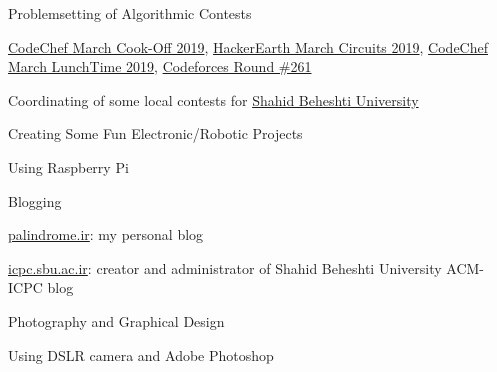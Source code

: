 

\begin{cvprojects}

  \cvproject
    {Problemsetting of Algorithmic Contests} %
    {} %
    {} %
    {} %
    {
      \begin{cvitems} %
        \item {\href{https://www.codechef.com/COOK104}{CodeChef March Cook-Off 2019}, \href{https://www.hackerearth.com/challenges/competitive/march-circuits-19/}{HackerEarth March Circuits 2019}, \href{https://www.codechef.com/LTIME70}{CodeChef March LunchTime 2019}, \href{https://codeforces.com/blog/entry/13394}{Codeforces Round \#261}}
        \item {Coordinating of some local contests for \href{http://en.sbu.ac.ir}{Shahid Beheshti University}}
      \end{cvitems}
    }

  \cvproject
    {Creating Some Fun Electronic/Robotic Projects} %
    {} %
    {} %
    {} %
    {\begin{cvitems}\item{Using Raspberry Pi}\end{cvitems}}

  \cvproject
    {Blogging} %
    {} %
    {} %
    {} %
    {\begin{cvitems}
    \item{\href{http://palindrome.ir}{palindrome.ir}: my personal blog}
    \item{\href{http://acm.sbu.ac.ir}{icpc.sbu.ac.ir}: creator and administrator of Shahid Beheshti University ACM-ICPC blog}
    \end{cvitems}}

  \cvproject
    {Photography and Graphical Design} %
    {} %
    {} %
    {} %
    {\begin{cvitems}\item{Using DSLR camera and Adobe Photoshop}\end{cvitems}}

\end{cvprojects}

